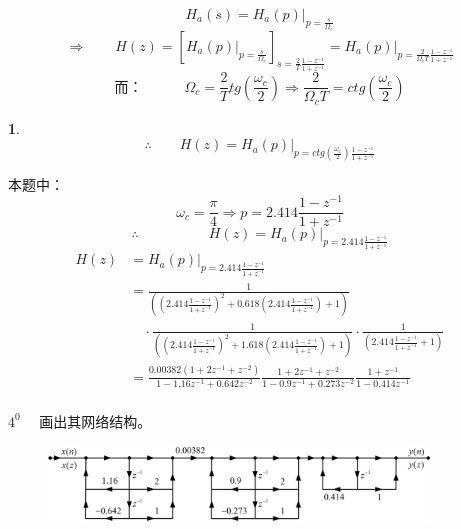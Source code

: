 \documentclass[notheorems,compress,mathserif,table]{beamer}
\newtheorem{dablock}{}
\begin{document}
\begin{frame}[allowframebreaks]
$$  H_a(s) = H_a(p)\Big|_{p=\frac{s}{\Omega_c}}$$
  $$\Longrightarrow\quad\quad H(z) = \left[H_a(p)|_{p=\frac{s}{\Omega_c}}\right]
  _{s=\frac{2}{T}\frac{1-z^{-1}}{1+z^{-1}}}
  = H_a(p)\Big|_{p=\frac{2}{\Omega_c T}\frac{1-z^{-1}}{1+z^{-1}}}$$
  $$\mbox{而：}\quad\quad\quad
  \Omega_c = \frac{2}{T}tg(\frac{\omega_c}{2}) \Longrightarrow
  \frac{2}{\Omega_c T} = ctg(\frac{\omega_c}{2})$$
  \begin{dablock}
  $$\therefore\quad\quad
  H(z) = H_a(p)\Big|_{p=ctg(\frac{\omega_c}{2})\frac{1-z^{-1}}{1+z^{-1}}}$$
  \end{dablock}
  本题中：
  $$\omega_c = \frac{\pi}{4}\Longrightarrow p = 2.414\frac{1-z^{-1}}{1+z^{-1}}$$
  $$\therefore\quad\quad\quad\quad\quad
  H(z) = H_a(p)\Big|_{p=2.414\frac{1-z^{-1}}{1+z^{-1}}}$$
  \newpage
  \begin{equation*}
  \begin{split}
  H(z) &= H_a(p)\Big|_{p=2.414\frac{1-z^{-1}}{1+z^{-1}}}\\
       &=\frac{1}{((2.414\frac{1-z^{-1}}{1+z^{-1}})^2 + 0.618(2.414\frac{1-z^{-1}}{1+z^{-1}})+1)} \\
       &\quad\cdot \frac{1}{((2.414\frac{1-z^{-1}}{1+z^{-1}})^2 + 1.618(2.414\frac{1-z^{-1}}{1+z^{-1}})+1)}
       \cdot\frac{1}{(2.414\frac{1-z^{-1}}{1+z^{-1}}+1)}\\
       &=\frac{0.00382(1+2z^{-1}+z^{-2})}{1-1.16z^{-1}+0.642z^{-2}}
         \frac{1+2z^{-1}+z^{-2}}{1-0.9z^{-1}+0.273z^{-2}}
         \frac{1+z^{-1}}{1-0.414z^{-1}}\\
  \end{split}
  \end{equation*}

  $4^0\quad$ 画出其网络结构。
  \begin{figure}[h]
    \centering
    \includegraphics[width=0.9\textwidth]{fig23_example1.jpg}
    \label{}
  \end{figure}
\end{frame}
\end{document}
